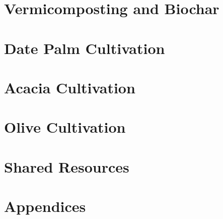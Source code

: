 \documentclass[12pt,a4paper,twoside]{report}
\begin{document}
\chapter{Vermicomposting and Biochar}









\chapter{Date Palm Cultivation}









\chapter{Acacia Cultivation}









\chapter{Olive Cultivation}









\chapter{Shared Resources}

%
%
%
%
%
%

\chapter{Appendices}
%
%
%
\end{document}
